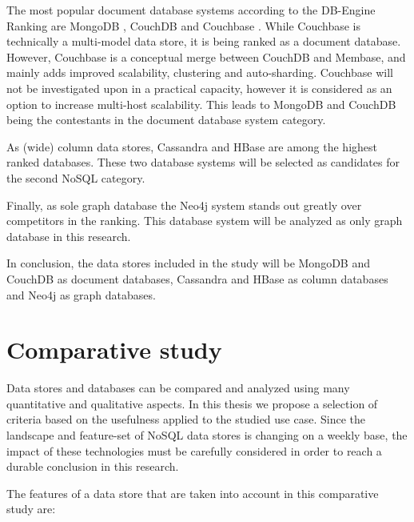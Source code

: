 The most popular document database systems according to the DB-Engine Ranking are MongoDB \autocite{MongoDB2009}, CouchDB \autocite{CouchDB2005} and Couchbase \autocite{Couchbase2010}. While Couchbase is technically a multi-model data store, it is being ranked as a document database. However, Couchbase is a conceptual merge between CouchDB and Membase, and mainly adds improved scalability, clustering and auto-sharding. Couchbase will not be investigated upon in a practical capacity, however it is considered as an option to increase multi-host scalability. This leads to MongoDB and CouchDB being the contestants in the document database system category.

As (wide) column data stores, Cassandra \autocite{Cassandra2008} and HBase \autocite{HBase2005} are among the highest ranked databases. These two database systems will be selected as candidates for the second NoSQL category.

Finally, as sole graph database the Neo4j system \autocite{Neo4j2007} stands out greatly over competitors in the ranking. This database system will be analyzed as only graph database in this research.

In conclusion, the data stores included in the study will be MongoDB and CouchDB as document databases, Cassandra and HBase as column databases and Neo4j as graph databases.

\section{Comparative study}
\label{sec:comparative-study}

Data stores and databases can be compared and analyzed using many quantitative and qualitative aspects. In this thesis we propose a selection of criteria based on the usefulness applied to the studied use case. Since the landscape and feature-set of NoSQL data stores is changing on a weekly base, the impact of these technologies must be carefully considered in order to reach a durable conclusion in this research.

The features of a data store that are taken into account in this comparative study are:

